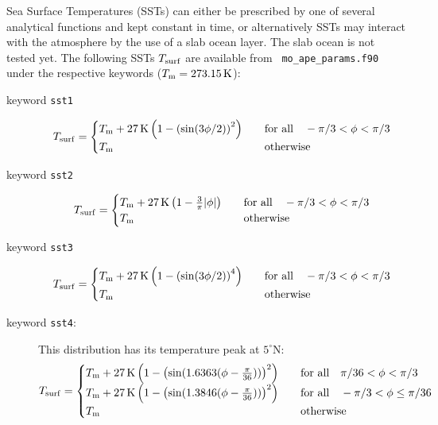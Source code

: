 Sea Surface Temperatures (SSTs) can either be prescribed by one of
several analytical functions and kept constant in time, or alternatively SSTs
may interact with the atmosphere by the use of a slab ocean layer. The 
slab ocean is not tested yet.
The following SSTs $T_{\rm surf}$ are available from {\tt
  mo\_ape\_params.f90} under the respective keywords ($T_{\rm
  m}=273.15\,{\rm K}$):  
\begin{description}
\item[keyword {\tt sst1}]
\begin{equation}
T_{\rm surf}=
\begin{cases}
T_{\rm m} + 27\,{\rm K} \left(1-\left(\sin(3\phi/2)\right)^2\right)
&\quad \text{for all} \quad -\pi/3<\phi<\pi/3\\
T_{\rm m} &\quad \text{otherwise}
\end{cases}
\end{equation}
\item[keyword {\tt sst2}]
\begin{equation}
T_{\rm surf}=
\begin{cases}
T_{\rm m} + 27\,{\rm K} \left(1-\frac{3}{\pi}|\phi|\right)
&\quad \text{for all} \quad -\pi/3<\phi<\pi/3\\
T_{\rm m} &\quad \text{otherwise}
\end{cases}
\end{equation}
\item[keyword {\tt sst3}]
\begin{equation}
T_{\rm surf}=
\begin{cases}
T_{\rm m} + 27\,{\rm K} \left(1-\left(\sin(3\phi/2)\right)^4\right)
&\quad \text{for all} \quad -\pi/3<\phi<\pi/3\\
T_{\rm m} &\quad \text{otherwise}
\end{cases}
\end{equation}
\item[keyword {\tt sst4}:]
This distribution has its temperature peak at $5^\circ$N:
\begin{equation}
T_{\rm surf}=
\begin{cases}
T_{\rm m} + 27\,{\rm K} \left(1-\left(\sin(1.6363(\phi-\frac{\pi}{36}))\right)^2\right)
&\quad \text{for all} \quad \pi/36<\phi<\pi/3\\
T_{\rm m} + 27\,{\rm K} \left(1-\left(\sin(1.3846(\phi-\frac{\pi}{36}))\right)^2\right)
&\quad \text{for all} \quad -\pi/3<\phi\le\pi/36\\
T_{\rm m} &\quad \text{otherwise}
\end{cases}
\end{equation}

\end{description}
